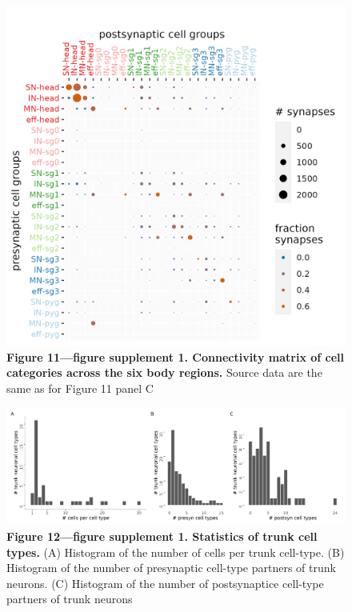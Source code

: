 \documentclass[
  11pt,
]{article}
\begin{document}
\begin{figure}[H]

{\centering \includegraphics[width=1\textwidth,height=\textheight]{Figures/Figure11_fig_suppl1.png}

}

\caption{\textbf{Figure 11---figure supplement 1. Connectivity matrix of
cell categories across the six body regions. } Source data are the same
as for Figure 11 panel C}

\end{figure}%

\begin{figure}[H]

{\centering \includegraphics[width=1\textwidth,height=\textheight]{Figures/Figure12_fig_suppl1.png}

}

\caption{\textbf{Figure 12---figure supplement 1. Statistics of trunk
cell types. } (A) Histogram of the number of cells per trunk cell-type.
(B) Histogram of the number of presynaptic cell-type partners of trunk
neurons. (C) Histogram of the number of postsynaptice cell-type partners
of trunk neurons}

\end{figure}%
\end{document}
